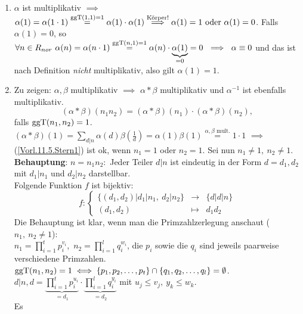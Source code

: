 \documentclass[a4paper,DIV15,BCOR12mm]{article}
\begin{document}
\begin{beweis}
    \begin{enumerate}\item
        $\alpha$ ist multiplikativ $\implies$ $\alpha(1)=\alpha(1
        \cdot 1)\stackrel{\mathop{\rm ggT}\nolimits(1,1)=1}{=} \alpha(1) \cdot \alpha(1)
        \stackrel{\text{Körper!}}{\implies} \alpha(1)=1 \text{ oder }
        \alpha(1)=0$. Falls $\alpha(1)=0$, so $\forall n\in R_{nor}\
        \alpha(n)=\alpha(n \cdot
        1)\stackrel{\mathop{\rm ggT}\nolimits(n,1)=1}{=}\alpha(n)\cdot
        \underbrace{\alpha(1)}_{=0}=0\ \implies\ \alpha \equiv 0$ und
        das ist nach Definition
        \emph{nicht} multiplikativ, also gilt $\alpha(1)=1$.

        \item Zu zeigen: $\alpha,\beta$ multiplikativ $\implies$ $ \alpha*\beta$
        multiplikativ und $\alpha^{-1}$ ist ebenfalls multiplikativ.
        \begin{equation}(\alpha * \beta)(n_1 n_2)=(\alpha * \beta) (n_1) \cdot
        (\alpha * \beta)(n_2)\label{Vorl.11.5.Stern1},\end{equation}
        falls $\mathop{\rm ggT}\nolimits(n_1,n_2)=1$. $(\alpha *
        \beta)(1)=\sum_{d|n} \alpha(d) \beta(\frac 1 d )=\alpha(1)
        \beta(1)\stackrel{\alpha,\beta \text{ mult.}}{=}1\cdot 1$
        $\implies$ (\ref{Vorl.11.5.Stern1}) ist ok, wenn $n_1=1$ oder
        $n_2=1$. Sei nun $n_1 \neq 1,\ n_2\neq 1$.\\
        \textbf{Behauptung}: $n=n_1 n_2:$ Jeder Teiler $d|n$ ist
        eindeutig in der Form $d=d_1,d_2$ mit $d_1|n_1$ und
        $d_2|n_2$ darstellbar.\\
        Folgende Funktion $f$ ist bijektiv:
        $$f:\left\{\begin{array}{rcl}
            \{(d_1,d_2) \big| d_1|n_1,\ d_2|n_2\} &\to&
            \{d\big|d|n\}\\
            (d_1,d_2) & \mapsto & d_1 d_2
        \end{array}\right.$$
        Die Behauptung ist klar, wenn man die Primzahlzerlegung
        anschaut ($n_1,\ n_2 \neq 1$):\\
        $n_1=\prod_{i=1}^t p_i^{v_i}$,\ $n_2=\prod_{i=1}^l q_i^{w_i}$,
        die $p_i$ sowie die $q_i$ sind jeweils paarweise
        verschiedene Primzahlen. $\mathop{\rm ggT}\nolimits(n_1,n_2)=1 \iff
        \{p_1,p_2,\dotsc,p_t\} \cap
        \{q_1,q_2,\dotsc,q_l\}=\emptyset$.\\
        $d|n, d=\underbrace{\prod_{i=1}^t p_i^{u_i}}_{=d_1} \cdot \underbrace{\prod_{i=1}^l
        q_i^{y_i}}_{=d_2}$ mit $u_j \leq v_j,\ y_k \leq w_k$.\\ Es

\end{enumerate}
\end{beweis}
\end{document}
